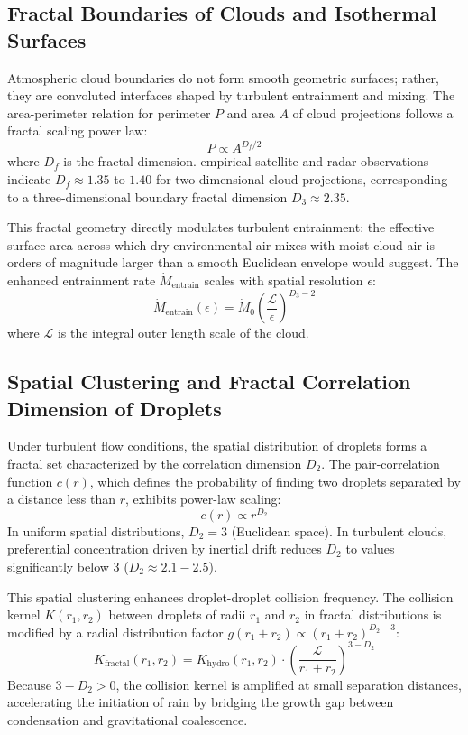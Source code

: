 \documentclass{article}
\begin{document}
\subsection{Fractal Boundaries of Clouds and Isothermal Surfaces}
Atmospheric cloud boundaries do not form smooth geometric surfaces; rather, they are convoluted interfaces shaped by turbulent entrainment and mixing. The area-perimeter relation for perimeter $P$ and area $A$ of cloud projections follows a fractal scaling power law:
\begin{equation}
P \propto A^{D_f / 2}
\end{equation}
where $D_f$ is the fractal dimension. empirical satellite and radar observations indicate $D_f \approx 1.35$ to $1.40$ for two-dimensional cloud projections, corresponding to a three-dimensional boundary fractal dimension $D_3 \approx 2.35$.

This fractal geometry directly modulates turbulent entrainment: the effective surface area across which dry environmental air mixes with moist cloud air is orders of magnitude larger than a smooth Euclidean envelope would suggest. The enhanced entrainment rate $\dot{M}_{\text{entrain}}$ scales with spatial resolution $\epsilon$:
\begin{equation}
\dot{M}_{\text{entrain}}(\epsilon) = \dot{M}_0 \left( \frac{\mathcal{L}}{\epsilon} \right)^{D_3 - 2}
\end{equation}
where $\mathcal{L}$ is the integral outer length scale of the cloud.

\subsection{Spatial Clustering and Fractal Correlation Dimension of Droplets}
Under turbulent flow conditions, the spatial distribution of droplets forms a fractal set characterized by the correlation dimension $D_2$. The pair-correlation function $c(r)$, which defines the probability of finding two droplets separated by a distance less than $r$, exhibits power-law scaling:
\begin{equation}
c(r) \propto r^{D_2}
\end{equation}
In uniform spatial distributions, $D_2 = 3$ (Euclidean space). In turbulent clouds, preferential concentration driven by inertial drift reduces $D_2$ to values significantly below 3 ($D_2 \approx 2.1 - 2.5$). 

This spatial clustering enhances droplet-droplet collision frequency. The collision kernel $K(r_1, r_2)$ between droplets of radii $r_1$ and $r_2$ in fractal distributions is modified by a radial distribution factor $g(r_1+r_2) \propto (r_1+r_2)^{D_2 - 3}$:
\begin{equation}
K_{\text{fractal}}(r_1, r_2) = K_{\text{hydro}}(r_1, r_2) \cdot \left( \frac{\mathcal{L}}{r_1 + r_2} \right)^{3 - D_2}
\end{equation}
Because $3 - D_2 > 0$, the collision kernel is amplified at small separation distances, accelerating the initiation of rain by bridging the growth gap between condensation and gravitational coalescence.
\end{document}
